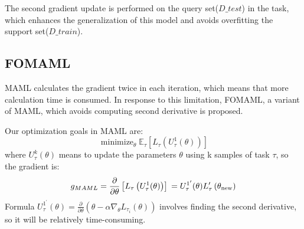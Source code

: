 The second gradient update is performed on the query set($D\_test$) in the task, which enhances the generalization of this model and avoids overfitting the support set($D\_train$).


\subsection{FOMAML}
MAML calculates the gradient twice in each iteration, which means that more calculation time is consumed. In response to this limitation, FOMAML, a variant of MAML, which avoids computing second derivative is proposed.

Our optimization goals in MAML are:
$$\operatorname{minimize}_{\theta} \mathbb{E}_{\tau}\left[L_{\tau}\left(U_{\tau}^{1}(\theta)\right)\right]$$
where $U_{\tau}^{k}(\theta)$ means to update the parameters $\theta$ using k samples of task $\tau$, so the gradient is:
$$g_{MAML}= \frac{\partial}{\partial \theta}\left[L_{\tau}\left(U_{\tau}^{1}(\theta)\right)\right]
  \\ = U_{\tau}^{1^{\prime}}(\theta) L_{\tau}^{\prime}\left(\theta_{\mathrm{new}}\right)
$$
Formula $U_{\tau}^{1^{\prime}}(\theta)=\frac{\partial}{\partial \theta}\left(\theta-\alpha \nabla_{\theta} L_{\tau_{i}}(\theta)\right)$ involves finding the second derivative, so it will be relatively time-consuming.

